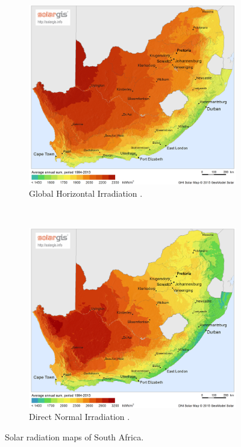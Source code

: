 \begin{figure}[h!]
        \centering
        \begin{subfigure}[b]{0.5\textwidth}
                \centering
                \includegraphics[width=1\textwidth]{FIG/SA_GHI}
                \caption{Global Horizontal Irradiation \cite{SolarGIS2015a}.}\label{fig:bild-links}
        \end{subfigure}%
        ~
        \begin{subfigure}[b]{0.5\textwidth}
                \centering
                \includegraphics[width=1\textwidth]{FIG/SA_DNI}
                \caption{Direct Normal Irradiation \cite{SolarGIS2015b}.}\label{fig:bild-rechts}
        \end{subfigure}
        \caption{Solar radiation maps of South Africa.}\label{irradiation}
\end{figure}
